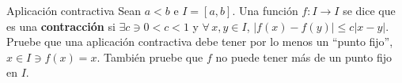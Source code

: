 \begin{solution}
	
\end{solution}

\begin{prob}{Aplicación contractiva}
	Sean $a<b$ e $I=\left[a,b\right]$. Una función $f\colon I\rightarrow I$ se dice que es una \textbf{contracción} si $\exists c\ni0<c<1$ y $\forall\,x,y\in I$, $|f\left(x\right)-f\left(y\right)|\leq c|x-y|$. Pruebe que una aplicación contractiva debe tener por lo menos un ``punto fijo'', $x\in I\ni f\left(x\right)=x$. También pruebe que $f$ no puede tener más de un punto fijo en $I$.
\end{prob}

\begin{solution}
	
\end{solution}

